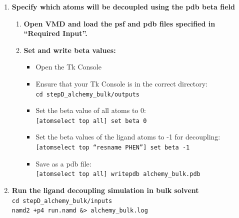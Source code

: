 \documentclass[9pt,tutorial]{Styling/livecoms}
\newcommand{\textInput}[1]{
  \texttt{#1}
}
\begin{document}
    \begin{enumerate}
        \item \textbf{Specify which atoms will be decoupled using the pdb beta field}\label{step:makeFEPpdb} 
        \begin{enumerate}[label=\alph*., ref=\theenumi.\alph*]
            \item \textbf{Open VMD and load the psf and pdb files specified in ``Required Input''.}
            \item \textbf{Set and write beta values:}
            \begin{itemize}
                \item Open the Tk Console
                \item Ensure that your Tk Console is in the correct directory:\\
                \textInput{cd stepD\_alchemy\_bulk/outputs}
                \item Set the beta value of all atoms to 0:\\
                \textInput{[atomselect top all] set beta 0}
                \item Set the beta values of the ligand atoms to -1 for decoupling:\\
                \textInput{[atomselect top ``resname PHEN''] set beta -1}
                \item Save as a pdb file:\\
                \textInput{[atomselect top all] writepdb alchemy\_bulk.pdb}
            \end{itemize}
        \end{enumerate}

        \item \textbf{Run the ligand decoupling simulation in bulk solvent}\\
        \textInput{cd stepD\_alchemy\_bulk/inputs}\\
        \textInput{namd2 +p4 run.namd \&> alchemy\_bulk.log}


\end{enumerate}
\end{document}
